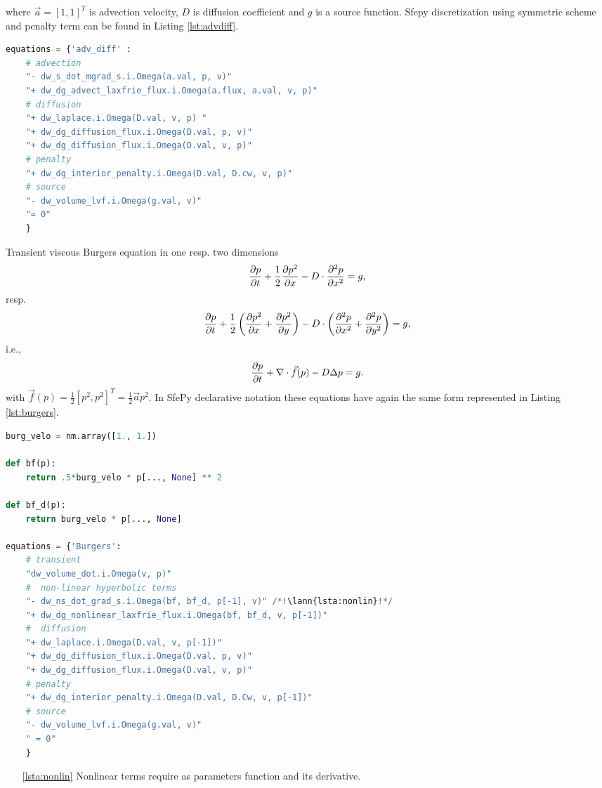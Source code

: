 where $\vec{a} = [1, 1]^T$ is advection velocity, $D$ is diffusion coefficient and $g$ is 
a source function. Sfepy discretization using symmetric scheme and penalty term can be 
found in Listing 
\ref{lst:advdiff}.
\setcounter{lstannotation}{0}
\begin{lstlisting}[language=Python, caption=Static advection-diffusion equation
\label{lst:advdiff}]
equations = {'adv_diff' :
	# advection
	"- dw_s_dot_mgrad_s.i.Omega(a.val, p, v)"
	"+ dw_dg_advect_laxfrie_flux.i.Omega(a.flux, a.val, v, p)"
	# diffusion
	"+ dw_laplace.i.Omega(D.val, v, p) "
	"+ dw_dg_diffusion_flux.i.Omega(D.val, p, v)"
	"+ dw_dg_diffusion_flux.i.Omega(D.val, v, p)"
	# penalty
	"+ dw_dg_interior_penalty.i.Omega(D.val, D.cw, v, p)"
	# source
	"- dw_volume_lvf.i.Omega(g.val, v)"
	"= 0"
	}
\end{lstlisting}
Transient viscous Burgers equation in one resp. two dimensions
\begin{equation}
\frac{\partial p}{\partial t} + \frac{1}{2}\frac{\partial p^2}{\partial x} - D \cdot\frac{\partial^2 p}{\partial x^2} = g,
\end{equation}
resp.
\begin{equation}
\label{eq:ex_burgers}
	\frac{\partial p}{\partial t} + \frac{1}{2}\left(\frac{\partial p^2}{\partial x} + \frac{\partial p^2}{\partial y}\right)  - 
	D \cdot \left( \frac{\partial^2 p}{\partial x^2} + \frac{\partial^2 p}{\partial y^2} \right) 
	= g,
\end{equation}
i.e.,
\begin{equation}
	\frac{\partial p}{\partial t} + \nabla \cdot \vec{f}(p) - D\Delta p = g.
\end{equation}
with $\vec{f}(p) = \frac{1}{2}[p^2, p^2]^T = \frac{1}{2}\vec{a} p^2$. In SfePy 
declarative notation these equations have again the same form represented in Listing 
\ref{lst:burgers}.
\setcounter{lstannotation}{0}
\begin{lstlisting}[language=Python, caption=Viscous Burgers equation \label{lst:burgers}]
burg_velo = nm.array([1., 1.])

def bf(p):
	return .5*burg_velo * p[..., None] ** 2

def bf_d(p):
	return burg_velo * p[..., None]

equations = {'Burgers':
	# transient
	"dw_volume_dot.i.Omega(v, p)"
	#  non-linear hyperbolic terms
	"- dw_ns_dot_grad_s.i.Omega(bf, bf_d, p[-1], v)" /*!\lann{lsta:nonlin}!*/
	"+ dw_dg_nonlinear_laxfrie_flux.i.Omega(bf, bf_d, v, p[-1])"
	#  diffusion
	"+ dw_laplace.i.Omega(D.val, v, p[-1])"
	"+ dw_dg_diffusion_flux.i.Omega(D.val, p, v)"
	"+ dw_dg_diffusion_flux.i.Omega(D.val, v, p)"
	# penalty
	"+ dw_dg_interior_penalty.i.Omega(D.val, D.Cw, v, p[-1])"
	# source
	"- dw_volume_lvf.i.Omega(g.val, v)"
	" = 0"
	}
\end{lstlisting}
\begin{itemize}
	\item[\ref{lsta:nonlin}] Nonlinear terms require as parameters function and its 
	derivative.
\end{itemize}